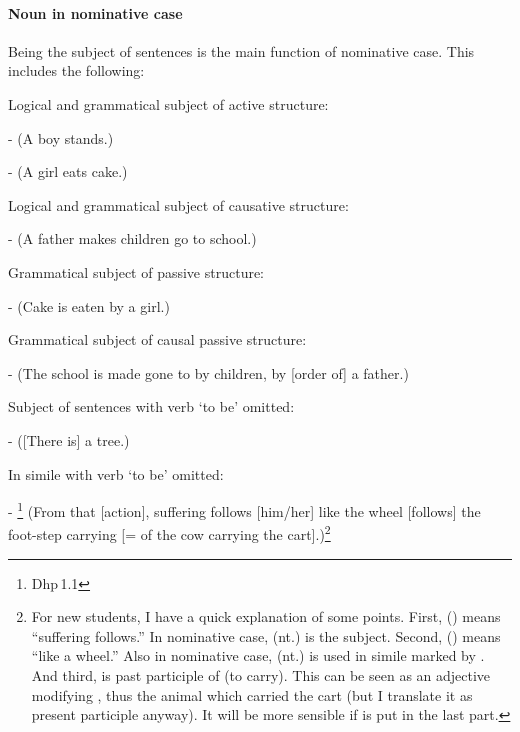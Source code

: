 \paragraph*{Noun in nominative case} Being the subject of sentences is the main function of nominative case. This includes the following:
\begin{compactenum}[(1)]
\item Logical and grammatical subject of active structure:\par
-  (A boy stands.)\par
-  (A girl eats cake.)\par
\item Logical and grammatical subject of causative structure:\par
- (A father makes children go to school.)\par
\item Grammatical subject of passive structure:\par
-  (Cake is eaten by a girl.)\par
\item Grammatical subject of causal passive structure:\par
-  (The school is made gone to by children, by [order of] a father.)\par
\item Subject of sentences with verb `to be' omitted:\par
-  ([There is] a tree.)\par
\item In simile with verb `to be' omitted:\par
- \footnote{Dhp\,1.1} (From that [action], suffering follows [him/her] like the wheel [follows] the foot-step carrying [= of the cow carrying the cart].)\footnote{For new students, I have a quick explanation of some points. First,  () means ``suffering follows.'' In nominative case,  (nt.) is the subject. Second,  () means ``like a wheel.'' Also in nominative case,  (nt.) is used in simile marked by . And third,  is past participle of  (to carry). This can be seen as an adjective modifying , thus the animal which carried the cart (but I translate it as present participle anyway). It will be more sensible if  is put in the last part.}\par

\end{compactenum}
